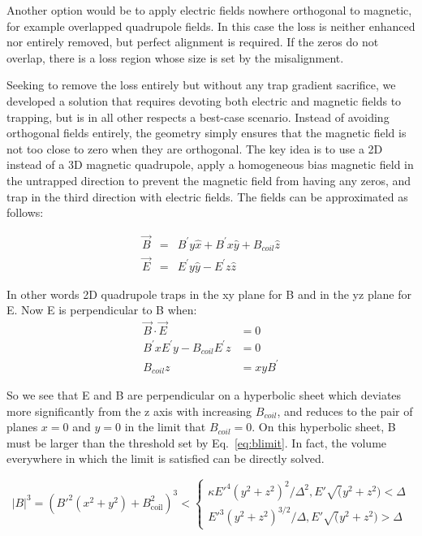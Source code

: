 \documentclass[%
 reprint,
 amsmath,amssymb,
 aps,
prl,
]{revtex4-1}
\begin{document}
Another option would be to apply electric fields nowhere orthogonal to magnetic, for example overlapped quadrupole fields. In this case the loss is neither enhanced nor entirely removed, but perfect alignment is required. If the zeros do not overlap, there is a loss region whose size is set by the misalignment. 

Seeking to remove the loss entirely but without any trap gradient sacrifice, we developed a solution that requires devoting both electric and magnetic fields to trapping, but is in all other respects a best-case scenario. Instead of avoiding orthogonal fields entirely, the geometry simply ensures that the magnetic field is not too close to zero when they are orthogonal. The key idea is to use a 2D instead of a 3D magnetic quadrupole, apply a homogeneous bias magnetic field in the untrapped direction to prevent the magnetic field from having any zeros, and trap in the third direction with electric fields. The fields can be approximated as follows:

\begin{eqnarray}
\vec{B} &=&  B^\prime y\hat{x}+ B^\prime x\hat{y} + B_{coil} \hat{z}\\
\vec{E} &=&  E^\prime y\hat{y}-  E^\prime z\hat{z}
\end{eqnarray}

In other words 2D quadrupole traps in the xy plane for B and in the yz plane for E. Now E is perpendicular to B when:
\begin{eqnarray}
\vec{B}\cdot \vec{E} &= 0\\
B^\prime x E^\prime y - B_{coil}  E^\prime z &= 0\\
B_{coil}z &= xyB^\prime
\end{eqnarray}

So we see that E and B are perpendicular on a hyperbolic sheet which deviates more significantly from the z axis with increasing $B_{coil}$, and reduces to the pair of planes $x=0$ and $y=0$ in the limit that $B_{coil} = 0$. On this hyperbolic sheet, B must be larger than the threshold set by Eq.~\ref{eq:blimit}. In fact, the volume everywhere in which the limit is satisfied can be directly solved. 

\begin{equation}
|B|^3 = \left(B'^2(x^2+y^2)+B_{\text{coil}}^2\right)^3 < \begin{cases} \kappa E'^4(y^2+z^2)^2/\Delta^2,  E'\sqrt(y^2+z^2)<\Delta\\ E'^3(y^2+z^2)^{3/2} /\Delta, E'\sqrt(y^2+z^2)>\Delta\end{cases}
\end{equation}
\end{document}
